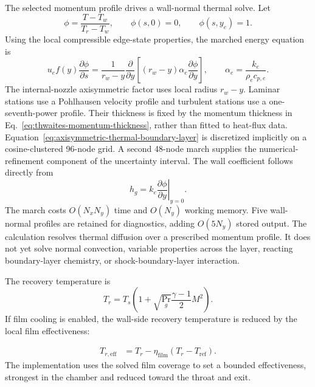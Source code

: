 \documentclass[11pt]{article}
\begin{document}
The selected momentum profile drives a wall-normal thermal solve. Let
\begin{equation}
\phi=\frac{T-T_w}{T_r-T_w},
\qquad
\phi(s,0)=0,
\qquad
\phi(s,y_e)=1.
\label{eq:thermal-boundary-layer-scalar}
\end{equation}
Using the local compressible edge-state properties, the marched energy equation is
\begin{equation}
u_e f(y)\frac{\partial\phi}{\partial s}
=\frac{1}{r_w-y}\frac{\partial}{\partial y}
\left[(r_w-y)\alpha_e\frac{\partial\phi}{\partial y}\right],
\qquad
\alpha_e=\frac{k_e}{\rho_e c_{p,e}}.
\label{eq:axisymmetric-thermal-boundary-layer}
\end{equation}
The internal-nozzle axisymmetric factor uses local radius $r_w-y$. Laminar stations use a Pohlhausen velocity profile and turbulent stations use a one-seventh-power profile. Their thickness is fixed by the momentum thickness in Eq.~\eqref{eq:thwaites-momentum-thickness}, rather than fitted to heat-flux data. Equation~\eqref{eq:axisymmetric-thermal-boundary-layer} is discretized implicitly on a cosine-clustered 96-node grid. A second 48-node march supplies the numerical-refinement component of the uncertainty interval. The wall coefficient follows directly from
\begin{equation}
h_g=k_e\left.\frac{\partial\phi}{\partial y}\right|_{y=0}.
\label{eq:resolved-wall-heat-transfer-coefficient}
\end{equation}
The march costs $O(N_xN_y)$ time and $O(N_y)$ working memory. Five wall-normal profiles are retained for diagnostics, adding $O(5N_y)$ stored output. The calculation resolves thermal diffusion over a prescribed momentum profile. It does not yet solve normal convection, variable properties across the layer, reacting boundary-layer chemistry, or shock-boundary-layer interaction.

The recovery temperature is
\begin{equation}
T_r=T_s\left(1+\sqrt{\Pr_g}\frac{\gamma-1}{2}M^2\right).
\label{eq:recovery-temperature}
\end{equation}
If film cooling is enabled, the wall-side recovery temperature is reduced by the local film effectiveness:
\par\medskip
\begin{equation}
\begin{aligned}
T_{r,\mathrm{eff}}
&=T_r-\eta_{\mathrm{film}}
\left(T_r-T_{\mathrm{ref}}\right).
\end{aligned}
\label{eq:film-recovery-temperature}
\end{equation}
The implementation uses the solved film coverage to set a bounded effectiveness, strongest in the chamber and reduced toward the throat and exit.
\end{document}

